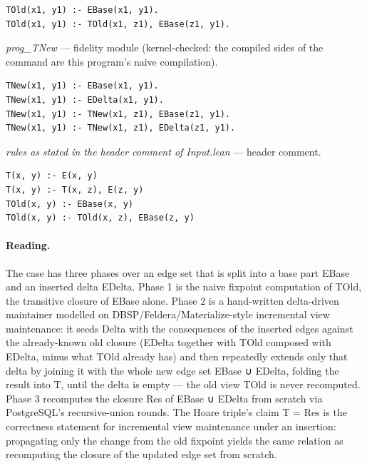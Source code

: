 \documentclass[10pt]{article}
\begin{document}
\begin{Verbatim}[fontsize=\scriptsize,breaklines=true,breakanywhere=true,frame=single,framesep=1.5mm]
TOld(x1, y1) :- EBase(x1, y1).
TOld(x1, y1) :- TOld(x1, z1), EBase(z1, y1).
\end{Verbatim}

{\raggedright\textit{prog\_TNew} --- fidelity module (kernel-checked: the compiled sides of the command are this program's naive compilation).\par}

\begin{Verbatim}[fontsize=\scriptsize,breaklines=true,breakanywhere=true,frame=single,framesep=1.5mm]
TNew(x1, y1) :- EBase(x1, y1).
TNew(x1, y1) :- EDelta(x1, y1).
TNew(x1, y1) :- TNew(x1, z1), EBase(z1, y1).
TNew(x1, y1) :- TNew(x1, z1), EDelta(z1, y1).
\end{Verbatim}

{\raggedright\textit{rules as stated in the header comment of Input.lean} --- header comment.\par}

\begin{Verbatim}[fontsize=\scriptsize,breaklines=true,breakanywhere=true,frame=single,framesep=1.5mm]
T(x, y) :- E(x, y)
T(x, y) :- T(x, z), E(z, y)
TOld(x, y) :- EBase(x, y)
TOld(x, y) :- TOld(x, z), EBase(z, y)
\end{Verbatim}

\paragraph{Reading.} The case has three phases over an edge set that is split into a base part EBase and an inserted delta EDelta. Phase 1 is the naive fixpoint computation of TOld, the transitive closure of EBase alone. Phase 2 is a hand-written delta-driven maintainer modelled on DBSP/Feldera/Materialize-style incremental view maintenance: it seeds Delta with the consequences of the inserted edges against the already-known old closure (EDelta together with TOld composed with EDelta, minus what TOld already has) and then repeatedly extends only that delta by joining it with the whole new edge set EBase ∪ EDelta, folding the result into T, until the delta is empty --- the old view TOld is never recomputed. Phase 3 recomputes the closure Res of EBase ∪ EDelta from scratch via PostgreSQL's recursive-union rounds. The Hoare triple's claim T = Res is the correctness statement for incremental view maintenance under an insertion: propagating only the change from the old fixpoint yields the same relation as recomputing the closure of the updated edge set from scratch.
\end{document}
